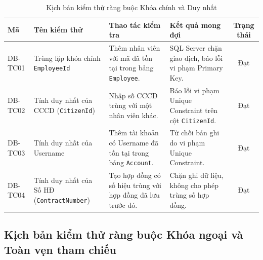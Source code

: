 \documentclass[12pt,a4paper]{report}
\begin{document}
\begin{table}[htbp]
\centering
\small
\begin{tabularx}{\textwidth}{|l|p{3.5cm}|p{3.8cm}|p{3.8cm}|c|}
\hline
\textbf{Mã} & \textbf{Tên kiểm thử} & \textbf{Thao tác kiểm tra} & \textbf{Kết quả mong đợi} & \textbf{Trạng thái} \\ \hline
DB-TC01 & Trùng lặp khóa chính \texttt{EmployeeId} & Thêm nhân viên với mã đã tồn tại trong bảng \texttt{Employee}. & SQL Server chặn giao dịch, báo lỗi vi phạm Primary Key. & Đạt \\ \hline
DB-TC02 & Tính duy nhất của CCCD (\texttt{CitizenId}) & Nhập số CCCD trùng với một nhân viên khác. & Báo lỗi vi phạm Unique Constraint trên cột \texttt{CitizenId}. & Đạt \\ \hline
DB-TC03 & Tính duy nhất của Username & Thêm tài khoản có Username đã tồn tại trong bảng \texttt{Account}. & Từ chối bản ghi do vi phạm Unique Constraint. & Đạt \\ \hline
DB-TC04 & Tính duy nhất của Số HĐ (\texttt{ContractNumber}) & Tạo hợp đồng có số hiệu trùng với hợp đồng đã lưu trước đó. & Chặn ghi dữ liệu, không cho phép trùng số hợp đồng. & Đạt \\ \hline
\end{tabularx}
\caption{Kịch bản kiểm thử ràng buộc Khóa chính và Duy nhất}
\end{table}

\subsection{Kịch bản kiểm thử ràng buộc Khóa ngoại và Toàn vẹn tham chiếu}
\end{document}
